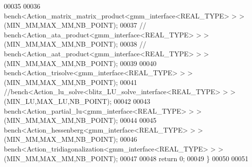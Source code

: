 \begin{DoxyCode}
00035 
00036   bench<Action\_matrix\_matrix\_product<gmm\_interface<REAL\_TYPE> > >(MIN\_MM,MAX\_MM,NB\_POINT);
00037 \textcolor{comment}{//   bench<Action\_ata\_product<gmm\_interface<REAL\_TYPE> > >(MIN\_MM,MAX\_MM,NB\_POINT);}
00038 \textcolor{comment}{//   bench<Action\_aat\_product<gmm\_interface<REAL\_TYPE> > >(MIN\_MM,MAX\_MM,NB\_POINT);}
00039 
00040   bench<Action\_trisolve<gmm\_interface<REAL\_TYPE> > >(MIN\_MM,MAX\_MM,NB\_POINT);
00041   \textcolor{comment}{//bench<Action\_lu\_solve<blitz\_LU\_solve\_interface<REAL\_TYPE> > >(MIN\_LU,MAX\_LU,NB\_POINT);}
00042 
00043   bench<Action\_partial\_lu<gmm\_interface<REAL\_TYPE> > >(MIN\_MM,MAX\_MM,NB\_POINT);
00044   
00045   bench<Action\_hessenberg<gmm\_interface<REAL\_TYPE> > >(MIN\_MM,MAX\_MM,NB\_POINT);
00046   bench<Action\_tridiagonalization<gmm\_interface<REAL\_TYPE> > >(MIN\_MM,MAX\_MM,NB\_POINT);
00047 
00048   \textcolor{keywordflow}{return} 0;
00049 \}
00050 
00051 
\end{DoxyCode}
